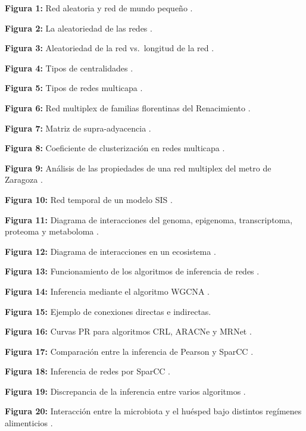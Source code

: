 \documentclass[
]{book}
\begin{document}
\textbf{Figura 1:} Red aleatoria y red de mundo pequeño \citep{schaeffer2007graph}.

\textbf{Figura 2:} La aleatoriedad de las redes \citep{watts1998collective}.

\textbf{Figura 3:} Aleatoriedad de la red vs.~longitud de la red \citep{watts1998collective}.

\textbf{Figura 4:} Tipos de centralidades \citep{farahani2019application}.

\textbf{Figura 5:} Tipos de redes multicapa \citep{bianconi2018multilayer}.

\textbf{Figura 6:} Red multiplex de familias florentinas del Renacimiento \citep{padgett1993robust}.

\textbf{Figura 7:} Matriz de supra-adyacencia \citep{cozzo2016multilayer}.

\textbf{Figura 8:} Coeficiente de clusterización en redes multicapa \citep{cozzo2013clustering}.

\textbf{Figura 9:} Análisis de las propiedades de una red multiplex del metro de Zaragoza \citep{aleta2017multilayer}.

\textbf{Figura 10:} Red temporal de un modelo SIS \citep{sanz2014dynamics}.

\textbf{Figura 11:} Diagrama de interacciones del genoma, epigenoma, transcriptoma, proteoma y metaboloma \citep{sun2016integrative}.

\textbf{Figura 12:} Diagrama de interacciones en un ecosistema \citep{schleuning2020trait}.

\textbf{Figura 13:} Funcionamiento de los algoritmos de inferencia de redes \citep{villaintroduction}.

\textbf{Figura 14:} Inferencia mediante el algoritmo WGCNA \citep{langfelder2008wgcna}.

\textbf{Figura 15:} Ejemplo de conexiones directas e indirectas.

\textbf{Figura 16:} Curvas PR para algoritmos CRL, ARACNe y MRNet \citep{meyer2008minet}.

\textbf{Figura 17:} Comparación entre la inferencia de Pearson y SparCC \citep{friedman2012inferring}.

\textbf{Figura 18:} Inferencia de redes por SparCC \citep{kurtz2015sparse}.

\textbf{Figura 19:} Discrepancia de la inferencia entre varios algoritmos \citep{hirano2019difficulty}.

\textbf{Figura 20:} Interacción entre la microbiota y el huésped bajo distintos regímenes alimenticios \citep{fan2021gut}.
\end{document}
